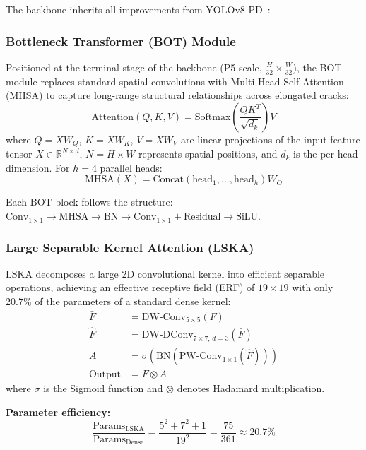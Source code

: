 \documentclass[conference]{IEEEtran}
\begin{document}
The backbone inherits all improvements from YOLOv8-PD~\cite{zeng2024yolov8pd}:

\subsubsection{Bottleneck Transformer (BOT) Module}
Positioned at the terminal stage of the backbone (P5 scale, $\frac{H}{32}\times\frac{W}{32}$), the BOT module replaces standard spatial convolutions with Multi-Head Self-Attention (MHSA) to capture long-range structural relationships across elongated cracks:
\begin{equation}
\text{Attention}(Q, K, V) = \text{Softmax}\left(\frac{QK^T}{\sqrt{d_k}}\right)V
\label{eq:attention}
\end{equation}
where $Q = XW_Q$, $K = XW_K$, $V = XW_V$ are linear projections of the input feature tensor $X \in \mathbb{R}^{N \times d}$, $N = H \times W$ represents spatial positions, and $d_k$ is the per-head dimension. For $h=4$ parallel heads:
\begin{equation}
\text{MHSA}(X) = \text{Concat}(\text{head}_1, \ldots, \text{head}_h)W_O
\end{equation}

Each BOT block follows the structure: $\text{Conv}_{1\times1} \rightarrow \text{MHSA} \rightarrow \text{BN} \rightarrow \text{Conv}_{1\times1} + \text{Residual} \rightarrow \text{SiLU}$.

\subsubsection{Large Separable Kernel Attention (LSKA)}
LSKA decomposes a large 2D convolutional kernel into efficient separable operations, achieving an effective receptive field (ERF) of $19\times19$ with only 20.7\% of the parameters of a standard dense kernel:
\begin{align}
\bar{F} &= \text{DW-Conv}_{5\times5}(F) \\
\hat{F} &= \text{DW-DConv}_{7\times7,\, d{=}3}(\bar{F}) \\
A &= \sigma\left(\text{BN}\left(\text{PW-Conv}_{1\times1}(\hat{F})\right)\right) \\
\text{Output} &= F \otimes A
\end{align}
where $\sigma$ is the Sigmoid function and $\otimes$ denotes Hadamard multiplication.

\textbf{Parameter efficiency:}
\begin{equation}
\frac{\text{Params}_{\text{LSKA}}}{\text{Params}_{\text{Dense}}} = \frac{5^2 + 7^2 + 1}{19^2} = \frac{75}{361} \approx 20.7\%
\end{equation}
\end{document}
